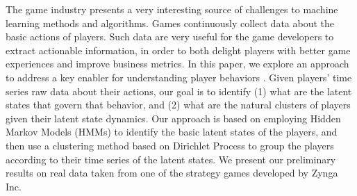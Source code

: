 The game industry presents a very interesting source of challenges to 
machine learning methods and algorithms.  Games continuously collect data 
about the basic actions of players. Such data are very useful for the game 
developers to extract actionable information, in order to both delight 
players with better game experiences and improve business metrics. 
In this paper, we explore an approach to address a key enabler for understanding 
player behaviors . Given players' time series raw data about 
their actions, our goal is to identify (1) what are the latent states that 
govern that behavior, and (2) what are the natural clusters of players given their 
latent state dynamics. Our approach is based on employing Hidden Markov Models (HMMs) to 
identify the basic latent states of the players, and then use a clustering method 
based on Dirichlet Process to group the players according to their time series 
of the latent states. We present our preliminary results on real data taken 
from one of the strategy games developed by Zynga Inc.   


